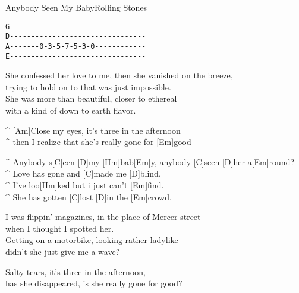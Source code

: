 \begin{song}{Anybody Seen My Baby}{Rolling Stones}

{\scriptsize
\begin{verbatim}
G--------------------------------
D--------------------------------
A-------0-3-5-7-5-3-0------------
E--------------------------------
\end{verbatim}
}
 
\begin{guitar}
She confessed her love to me, then she vanished on the breeze,\\
trying to hold on to that was just impossible.\\
She was more than beautiful, closer to ethereal\\
with a kind of down to earth flavor.\\
\end{guitar}

\begin{guitar}
^ [Am]Close my eyes, it's three in the afternoon\\
^ then I realize that she's really gone for [Em]good\\
\end{guitar}

\begin{guitar}
^ Anybody s[C]een [D]my [Hm]bab[Em]y, anybody [C]seen [D]her a[Em]round?\\
^ Love has gone and [C]made me [D]blind,\\
^ I've loo[Hm]ked but i just can't [Em]find.\\
^ She has gotten [C]lost [D]in the [Em]crowd.\\
\end{guitar}

\begin{guitar}
I was flippin' magazines, in the place of Mercer street\\
when I thought I spotted her.\\
Getting on a motorbike, looking rather ladylike\\
didn't she just give me a wave?\\
\end{guitar}

\begin{guitar}
Salty tears, it's three in the afternoon,\\
has she disappeared, is she really gone for good?\\
\end{guitar}


\end{song}
